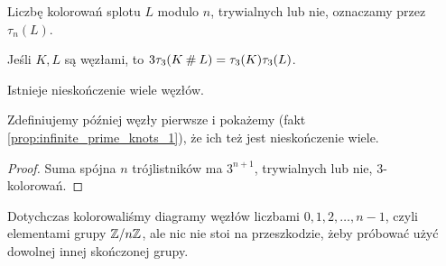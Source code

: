 Liczbę kolorowań splotu $L$ modulo $n$, trywialnych lub nie, oznaczamy przez $\tau_n(L)$.

\begin{proposition}
    Jeśli $K, L$ są węzłami, to $3\tau_3(K \mathbin{\#} L) = \tau_3(K)\tau_3(L)$.
\end{proposition}

\begin{corollary}
    Istnieje nieskończenie wiele węzłów.
\end{corollary}

Zdefiniujemy później węzły pierwsze i pokażemy (fakt \ref{prop:infinite_prime_knots_1}), że ich też jest nieskończenie wiele.

\begin{proof}
    Suma spójna $n$ trójlistników ma $3^{n+1}$, trywialnych lub nie, $3$-kolorowań.
\end{proof}

Dotychczas kolorowaliśmy diagramy węzłów liczbami $0, 1, 2, \ldots, n-1$, czyli elementami grupy $\mathbb Z/n\mathbb Z$, ale nic nie stoi na przeszkodzie, żeby próbować użyć dowolnej innej skończonej grupy.




%

